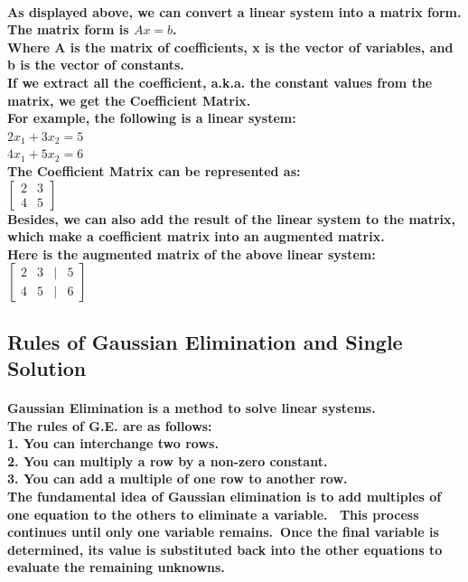 \documentclass{article}
\begin{document}
\paragraph{As displayed above, we can convert a linear system into a matrix form.\\
The matrix form is $Ax = b$.\\
Where A is the matrix of coefficients, x is the vector of variables, and b is the vector of constants.\\
\hfill
If we extract all the coefficient, a.k.a. the constant values from the matrix, we get the Coefficient Matrix.\\
For example, the following is a linear system:\\
$2x_1 + 3x_2 = 5$\\
$4x_1 + 5x_2 = 6$\\
The Coefficient Matrix can be represented as:\\
$\begin{bmatrix} 2 & 3 \\ 4 & 5 \end{bmatrix}$\\
\hfill
Besides, we can also add the result of the linear system to the matrix, which make a coefficient matrix into an augmented matrix.\\
Here is the augmented matrix of the above linear system:\\
$\begin{bmatrix} 2 & 3 &|& 5 \\ 4 & 5 &|& 6 \end{bmatrix}$\\}


\subsection{Rules of Gaussian Elimination and Single Solution}

\paragraph{Gaussian Elimination is a method to solve linear systems.\\
The rules of G.E. are as follows:\\
1. You can interchange two rows.\\
2. You can multiply a row by a non-zero constant.\\
3. You can add a multiple of one row to another row.\\
\hfill
The fundamental idea of Gaussian elimination is to add multiples of one equation to the others to eliminate a variable. 
This process continues until only one variable remains. Once the final variable is determined, 
its value is substituted back into the other equations to evaluate the remaining unknowns.\\}
\end{document}
